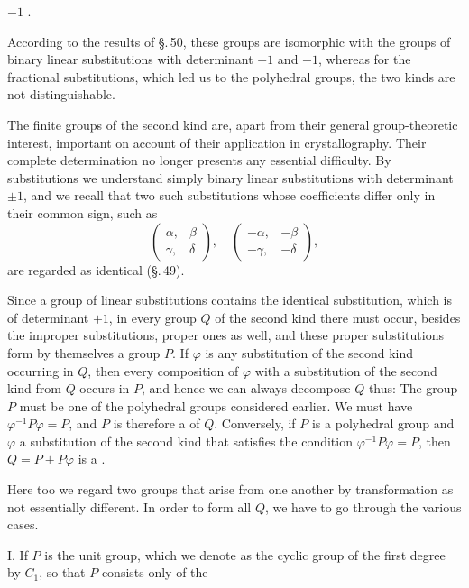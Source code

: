 
 $-1$ .

According to the results of \S.\,50, these groups are isomorphic with the groups of binary linear substitutions with determinant $+1$ and $-1$, whereas for the fractional substitutions, which led us to the polyhedral groups, the two kinds are not distinguishable.

The finite groups of the second kind are, apart from their general group-theoretic interest, important on account of their application in crystallography. Their complete determination no longer presents any essential difficulty. By substitutions we understand simply binary linear substitutions with determinant $\pm 1$, and we recall that two such substitutions whose coefficients differ only in their common sign, such as
\[
\begin{pmatrix} \alpha, & \beta \\ \gamma, & \delta \end{pmatrix}, \quad
\begin{pmatrix} -\alpha, & -\beta \\ -\gamma, & -\delta \end{pmatrix},
\]
are regarded as identical (\S.\,49).

Since a group of linear substitutions contains the identical substitution, which is of determinant $+1$, in every group $Q$ of the second kind there must occur, besides the improper substitutions, proper ones as well, and these proper substitutions form by themselves a group $P$. If $\varphi$ is any substitution of the second kind occurring in $Q$, then every composition of $\varphi$ with a substitution of the second kind from $Q$ occurs in $P$, and hence we can always decompose $Q$ thus:
The group $P$ must be one of the polyhedral groups considered earlier. We must have $\varphi^{-1}P\varphi = P$, and $P$ is therefore a  of $Q$. Conversely, if $P$ is a polyhedral group and $\varphi$ a substitution of the second kind that satisfies the condition $\varphi^{-1}P\varphi = P$, then $Q = P + P\varphi$ is a .

Here too we regard two groups that arise from one another by transformation as not essentially different. In order to form all $Q$, we have to go through the various cases.

I. If $P$ is the unit group, which we denote as the cyclic group of the first degree by $C_1$, so that $P$ consists only of the
